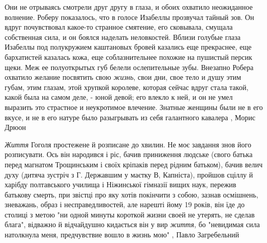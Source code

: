 Они не отрываясь смотрели друг другу в глаза, и обоих охватило неожиданное
волнение. Роберу показалось, что в голосе Изабеллы прозвучал тайный зов. Он
вдруг почувствовал какое-то странное смятение, его сковывала, смущала
собственная сила, и он боялся наделать неловкостей. Вблизи голубые глаза
Изабеллы под полукружием каштановых бровей казались еще прекраснее, еще
бархатистей казалась кожа, еще соблазнительнее похожие на пушистый персик щеки.
Меж ее полуоткрытых губ белели ослепительные зубы. Внезапно Робера охватило
желание посвятить свою \emph{жизнь}, свои дни, свое тело и душу этим губам,
этим глазам, этой хрупкой королеве, которая сейчас вдруг стала такой, какой
была на самом деле, - юной девой; его влекло к ней, и он не умел выразить это
страстное и неукротимое влечение. Знатные женщины были не в его вкусе, и не в
его натуре было разыгрывать из себя галантного кавалера
, Морис Дрюон

\emph{Життя} Гоголя простежене й розписане до хвилин. Не моє завдання знов його
розписувати. Ось він народився і ріс, бачив приниження людське (свого батька
перед магнатом Трощинським і своїх кріпаків перед рідним батьком), бачив велич
духу (дитяча зустріч з Г. Державшим у маєтку В, Капніста), пройшов сціллу й
харібду полтавського училища і Ніжинської гімназії вищих наук, пережив батькову
смерть, при звістці про яку хотів покінчити з собою, зазнав осмішнень,
зневажань, образ і несправедливостей, але нарешті йому 19 років, він їде до
столиці з метою "ни одной минуты короткой жизни своей не утерять, не сделав
блага", відважно й відчайдушно кидається він у вир \emph{життя}, бо "невидимая сила
натолкнула меня, предчувствие вошло в жизнь мою"
, Павло Загребельний
